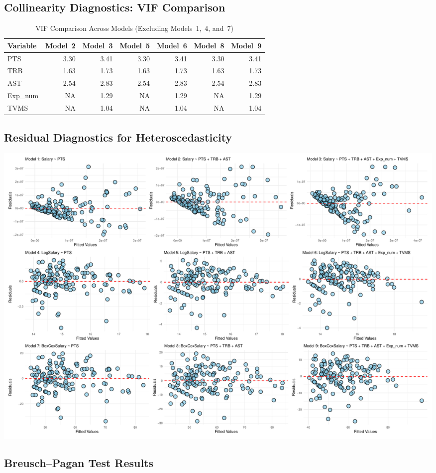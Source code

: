 \documentclass[
  11pt,
]{article}
\begin{document}
\hypertarget{tab:appendix-vif}{%
\subsection{Collinearity Diagnostics: VIF Comparison}\label{tab:appendix-vif}}

\begin{table}[!h]
\centering
\caption{\label{tab:appendix-vif-table}VIF Comparison Across Models (Excluding Models 1, 4, and 7)}
\centering
\begin{tabular}[t]{lrrrrrr}
\toprule
Variable & Model 2 & Model 3 & Model 5 & Model 6 & Model 8 & Model 9\\
\midrule
PTS & 3.30 & 3.41 & 3.30 & 3.41 & 3.30 & 3.41\\
TRB & 1.63 & 1.73 & 1.63 & 1.73 & 1.63 & 1.73\\
AST & 2.54 & 2.83 & 2.54 & 2.83 & 2.54 & 2.83\\
Exp\_num & NA & 1.29 & NA & 1.29 & NA & 1.29\\
TVMS & NA & 1.04 & NA & 1.04 & NA & 1.04\\
\bottomrule
\end{tabular}
\end{table}
\FloatBarrier

\hypertarget{fig:appendix-hetero}{%
\subsection{Residual Diagnostics for Heteroscedasticity}\label{fig:appendix-hetero}}

\includegraphics{lab2_report_short_files/figure-latex/appendix-hetero-plot-1.pdf}
\FloatBarrier

\hypertarget{tab:appendix-bp}{%
\subsection{Breusch--Pagan Test Results}\label{tab:appendix-bp}}
\end{document}
